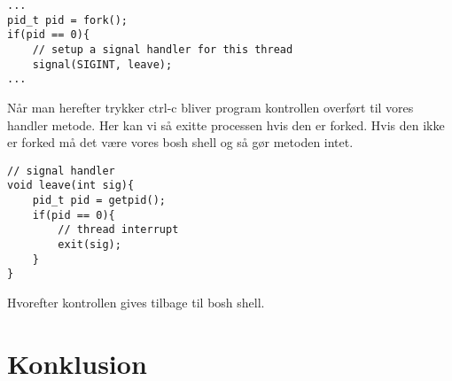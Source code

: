 \documentclass[danish]{report}
\begin{document}
\begin{lstlisting}
...
pid_t pid = fork();
if(pid == 0){
	// setup a signal handler for this thread
	signal(SIGINT, leave);
...
\end{lstlisting}

Når man herefter trykker ctrl-c bliver program kontrollen overført til vores handler metode. Her kan vi så exitte processen hvis den er forked. Hvis den ikke er forked må det være vores bosh shell og så gør metoden intet. 

\begin{lstlisting}
// signal handler
void leave(int sig){
	pid_t pid = getpid();
	if(pid == 0){
		// thread interrupt
		exit(sig);
	}
}
\end{lstlisting}


Hvorefter kontrollen gives tilbage til bosh shell.

\chapter{Konklusion}
\end{document}
